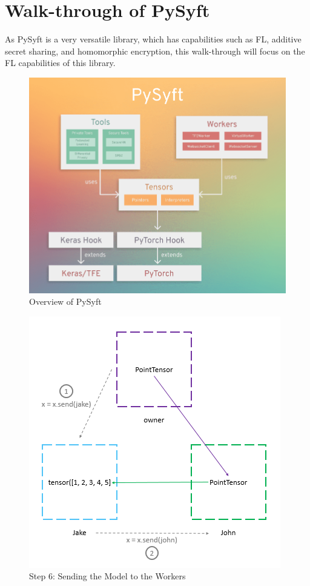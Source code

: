 \documentclass[conference]{IEEEtran}
\begin{document}
\section{Walk-through of PySyft}

As PySyft is a very versatile library, which has capabilities such as FL,
additive secret sharing, and homomorphic encryption, this walk-through will
focus on the FL capabilities of this library.

\begin{figure}[h]
    \centering
    \includegraphics[width=0.8\linewidth]{overview.png}
    \caption{Overview of PySyft\cite{b4}}
    \label{fig:overview}
\end{figure}

\begin{figure}[h]
    \centering
    \includegraphics[width=0.8\linewidth]{send.png}
    \caption{Step 6: Sending the Model to the Workers\cite{b3}}
    \label{fig:send}
\end{figure}
\end{document}
